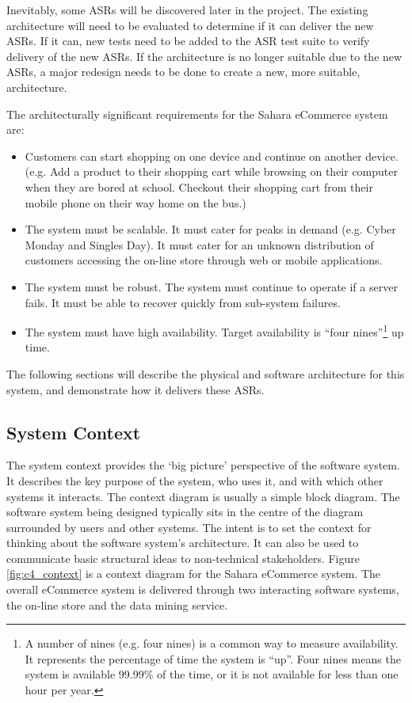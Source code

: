 Inevitably, some ASRs will be discovered later in the project.
The existing architecture will need to be evaluated to determine if it can deliver the new ASRs.
If it can, new tests need to be added to the ASR test suite to verify delivery of the new ASRs.
If the architecture is no longer suitable due to the new ASRs,
a major redesign needs to be done to create a new, more suitable, architecture.

The architecturally significant requirements for the Sahara eCommerce system are:
\begin{itemize}
    \item Customers can start shopping on one device and continue on another device.
             (e.g. Add a product to their shopping cart while browsing on their computer when they are bored at school.
              Checkout their shopping cart from their mobile phone on their way home on the bus.)
    \item The system must be scalable. It must cater for peaks in demand (e.g. Cyber Monday and Singles Day).
             It must cater for an unknown distribution of customers accessing the on-line store through web or mobile applications.
    \item The system must be robust. The system must continue to operate if a server fails.
             It must be able to recover quickly from sub-system failures.
    \item The system must have high availability.
             Target availability is ``four nines''\footnote{A number of nines (e.g. four nines)
             is a common way to measure availability. It represents the percentage of time the system is ``up''.
             Four nines means the system is available 99.99\% of the time, or it is not available for less than one hour per year.}
            up time.
\end{itemize}
\noindent
The following sections will describe the physical and software architecture for this system, and demonstrate how it delivers these ASRs.

\subsection{System Context}
The system context provides the `big picture' perspective of the software system.
It describes the key purpose of the system, who uses it, and with which other systems it interacts.
The context diagram is usually a simple block diagram.
The software system being designed typically sits in the centre of the diagram surrounded by users and other systems.
The intent is to set the context for thinking about the software system's architecture.
It can also be used to communicate basic structural ideas to non-technical stakeholders.
Figure \ref{fig:c4_context} is a context diagram for the Sahara eCommerce system.
The overall eCommerce system is delivered through two interacting software systems,
the on-line store and the data mining service.

